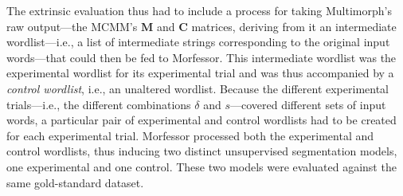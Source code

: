 The extrinsic evaluation thus had to include a process for taking Multimorph's raw output---the MCMM's
$\textbf{M}$ and $\textbf{C}$ matrices, deriving from it an intermediate wordlist---i.e.,
a list of intermediate strings corresponding to the original input words---that could %
then be fed to Morfessor. 
This intermediate wordlist was the experimental wordlist for its experimental trial
and was thus accompanied by a \emph{control wordlist}, i.e., an unaltered wordlist.
Because the different experimental trials---i.e., 
the different combinations $\delta$ and $s$---covered
different sets of input words, a particular pair of experimental and control wordlists had to be created for each
experimental trial.
Morfessor processed both the experimental and control wordlists, 
thus inducing two distinct unsupervised segmentation 
models, one experimental and one control. 
These two models were evaluated
against the same gold-standard dataset. 



